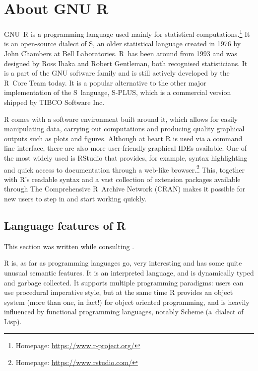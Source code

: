 \chapter{About GNU R\label{gnur}}

GNU~R \autocite{about} is a programming language used mainly for statistical computations.\footnote{Homepage: \url{https://www.r-project.org/}} It is an open-source dialect of S, an older statistical language created in 1976 by John Chambers at Bell Laboratories. R~has been around from 1993 and was designed by Ross Ihaka and Robert Gentleman, both recognised statisticians. It is a part of the GNU software family and is still actively developed by the R~Core Team today. It is a popular alternative to the other major implementation of the S~language, S-PLUS, which is a commercial version shipped by TIBCO Software Inc.

R comes with a software environment built around it, which allows for easily manipulating data, carrying out computations and producing quality graphical outputs such as plots and figures. Although at heart R is used via a command line interface, there are also more user-friendly graphical IDEs available. One of the most widely used is RStudio that provides, for example, syntax highlighting and quick access to documentation through a web-like browser.\footnote{Homepage: \url{https://www.rstudio.com/}} This, together with R's readable syntax and a vast collection of extension packages available through The Comprehensive R~Archive Network (CRAN) makes it possible for new users to step in and start working quickly.


\section{Language features of R}

This section was written while consulting \autocite{hadley, design, inferno, rint, rlang}.

R is, as far as programming languages go, very interesting and has some quite unusual semantic features. It is an interpreted language, and is dynamically typed and garbage collected. It supports multiple programming paradigms: users can use procedural imperative style, but at the same time R provides an object system (more than one, in fact!) for object oriented programming, and is heavily influenced by functional programming languages, notably Scheme (a~dialect of Lisp).


